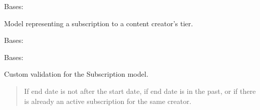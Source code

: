 \documentclass[letterpaper,10pt,english]{sphinxmanual}
\begin{document}
\begin{fulllineitems}
\label{\detokenize{modules/models:client.models.Subscription}}
\pysigstartsignatures
{}
\pysigstopsignatures
\sphinxAtStartPar
Bases: 

\sphinxAtStartPar
Model representing a subscription to a content creator’s tier.

\begin{fulllineitems}
\label{\detokenize{modules/models:client.models.Subscription.DoesNotExist}}
\pysigstartsignatures
{}
\pysigstopsignatures
\sphinxAtStartPar
Bases: 

\end{fulllineitems}


\begin{fulllineitems}
\label{\detokenize{modules/models:client.models.Subscription.MultipleObjectsReturned}}
\pysigstartsignatures
{}
\pysigstopsignatures
\sphinxAtStartPar
Bases: 

\end{fulllineitems}


\begin{fulllineitems}
\label{\detokenize{modules/models:client.models.Subscription.clean}}
\pysigstartsignatures
{}
\pysigstopsignatures
\sphinxAtStartPar
Custom validation for the Subscription model.
\begin{quote}\begin{description}
\sphinxAtStartPar
{} \textendash{} If end date is not after the start date, if end date is in the past,
    or if there is already an active subscription for the same creator.


\end{description}
\end{quote}
\end{fulllineitems}
\end{fulllineitems}
\end{document}
